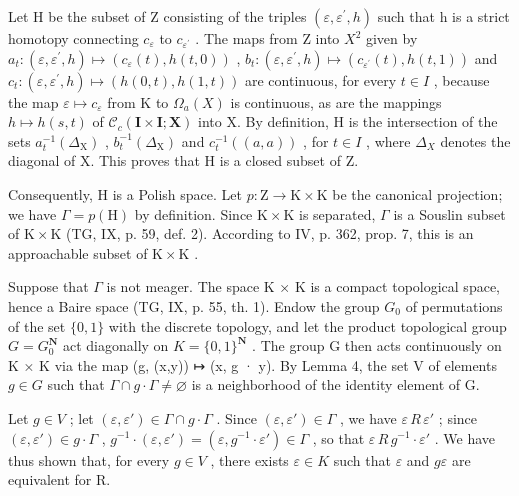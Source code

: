 Let H be the subset of Z consisting of the triples \((\varepsilon,\varepsilon^{\prime},h)\) such that h is a strict homotopy connecting \(c_{\varepsilon}\) to \(c_{\varepsilon^{\prime}}\) . The maps from Z into \(X^{2}\) given by \(a_{t}\colon(\varepsilon,\varepsilon^{\prime},h)\mapsto(c_{\varepsilon}(t),h(t,0))\) , \(b_{t}\colon(\varepsilon,\varepsilon^{\prime},h)\mapsto(c_{\varepsilon^{\prime}}(t),h(t,1))\) and \(c_{t}\colon(\varepsilon,\varepsilon^{\prime},h)\mapsto(h(0,t),h(1,t))\) are continuous, for every \(t\in I\) , because the map \(\varepsilon\mapsto c_{\varepsilon}\) from K to \(\Omega_{a}(X)\) is continuous, as are the mappings \(h\mapsto h(s,t)\) of \(\mathcal{C}_{c}(\mathbf{I}\times\mathbf{I};\mathbf{X})\) into X. By definition, H is the intersection of the sets \(a_{t}^{-1}(\Delta_{\mathrm{X}})\) , \(b_{t}^{-1}(\Delta_{\mathrm{X}})\) and \(c_{t}^{-1}((a,a))\) , for \(t\in I\) , where \(\Delta_{X}\) denotes the diagonal of X. This proves that H is a closed subset of Z.

Consequently, H is a Polish space. Let \(p \colon \mathrm{Z} \to \mathrm{K} \times \mathrm{K}\) be the canonical projection; we have \(\Gamma = p(\mathrm{H})\) by definition. Since \(\mathrm{K} \times \mathrm{K}\) is separated, \(\Gamma\) is a Souslin subset of \(\mathrm{K} \times \mathrm{K}\) (TG, IX, p. 59, def. 2). According to IV, p. 362, prop. 7, this is an approachable subset of \(\mathrm{K} \times \mathrm{K}\) .

Suppose that \(\Gamma\) is not meager. The space K × K is a compact topological space, hence a Baire space (TG, IX, p. 55, th. 1). Endow the group \(G_{0}\) of permutations of the set \(\{0,1\}\) with the discrete topology, and let the product topological group \(G = G_{0}^{\mathbf{N}}\) act diagonally on \(K = \{0,1\}^{\mathbf{N}}\) . The group G then acts continuously on K × K via the map (g, (x,y)) ↦ (x, g · y). By Lemma 4, the set V of elements \(g \in G\) such that \(\Gamma \cap g \cdot \Gamma \neq \varnothing\) is a neighborhood of the identity element of G.

Let \(g \in V\) ; let \((\varepsilon, \varepsilon') \in \Gamma \cap g \cdot \Gamma\) . Since \((\varepsilon, \varepsilon') \in \Gamma\) , we have \(\varepsilon\,R\,\varepsilon'\) ; since \((\varepsilon, \varepsilon') \in g \cdot \Gamma\) , \(g^{-1} \cdot (\varepsilon, \varepsilon') = (\varepsilon, g^{-1}\cdot\varepsilon') \in \Gamma\) , so that \(\varepsilon\,R\,g^{-1}\cdot\varepsilon'\) . We have thus shown that, for every \(g \in V\) , there exists \(\varepsilon \in K\) such that \(\varepsilon\) and \(g\varepsilon\) are equivalent for R.

